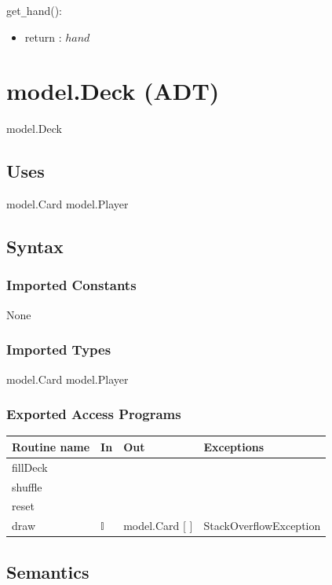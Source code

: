 \documentclass[12pt, titlepage]{article}
\begin{document}
\noindent get\verb|_|hand():
\begin{itemize}
\item return : $hand$ 
\end{itemize}

\section* {model.Deck (ADT)}

model.Deck

\subsection* {Uses}

model.Card
model.Player

\subsection* {Syntax}

\subsubsection* {Imported Constants}

None

\subsubsection* {Imported Types}

model.Card
model.Player

\subsubsection* {Exported Access Programs}

\begin{tabular}{| l | l | l | p{5cm} |}
\hline
\textbf{Routine name} & \textbf{In} & \textbf{Out} & \textbf{Exceptions}\\
\hline
fillDeck & & &\\
\hline
shuffle & & &\\
\hline 
reset & & &\\
\hline 
draw & $\mathbb{I}$& model.Card [ ] & StackOverflowException\\
\hline 
\end{tabular}

\subsection* {Semantics}
\end{document}
